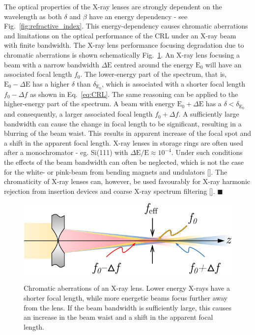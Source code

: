 \begin{refsection}
The optical properties of the X-ray lenses are strongly dependent on the wavelength as both $\delta$ and $\beta$ have an energy dependency - see Fig.~\ref{fig:refractive_index}. This energy-dependency causes chromatic aberrations and limitations on the optical performance of the CRL under an X-ray beam with finite bandwidth. The X-ray lens performance focusing degradation due to chromatic aberrations is shown schematically Fig.~\ref{fig:chroamticity}. An X-ray lens focusing a beam with a narrow bandwidth $\Delta \text{E}$ centred around the energy $\text{E}_0$ will have an associated focal length $f_0$. The lower-energy part of the spectrum, that is, $\text{E}_0-\Delta \text{E}$ has a higher $\delta$ than $\delta_{\text{E}_0}$, which is associated with a shorter focal length $f_0-\Delta f$ as shown in Eq.~\ref{eq:CRL}. The same reasoning can be applied to the higher-energy part of the spectrum. A beam with energy $\text{E}_0+\Delta \text{E}$ has a $\delta<\delta_{\text{E}_0}$ and consequently, a larger associated focal length $f_0+\Delta f$. A sufficiently large bandwidth can cause the change in focal length to be significant, resulting in a blurring of the beam waist. This results in apparent increase of the focal spot and a shift in the apparent focal length. X-ray lenses in storage rings are often used after a monochromator - eg. Si(111) with $\Delta \text{E}/\text{E}\approx10^{-4}$. Under such conditions the effects of the beam bandwidth can often be neglected, which is not the case for the white- or pink-beam from bending magnets and undulators [\cite{Seiboth2014}]. The chromaticity of X-ray lenses can, however, be used favourably for X-ray harmonic rejection from insertion devices and coarse X-ray spectrum filtering [\cite{Vaughan2011, Polikarpov2014}]. $\blacksquare$

\begin{figure}[h]
    \centering
    {\includegraphics[width=0.5\linewidth]{figures/ch02/chromaticity.pdf}}
    \caption[Chromatic aberrations]{Chromatic aberrations of an X-ray lens. Lower energy X-rays have a shorter focal length, while more energetic beams focus further away from the lens. If the beam bandwidth is sufficiently large, this causes an increase in the beam waist and a shift in the apparent focal length.}
    \label{fig:chroamticity}
\end{figure}

\printbibliography[heading=subbibliography]
\end{refsection}


